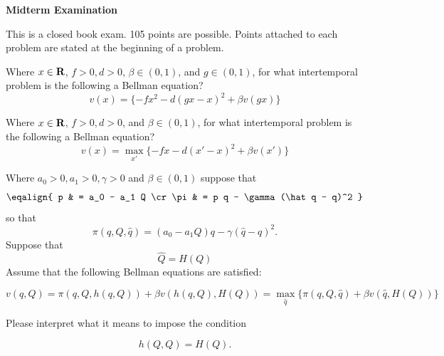 
\paper

\overfullrule=0pt
\def\frac#1#2{#1\over #2}
%
\def\bmatrix#1{\left[ \matrix{#1} \right]}
\def\be{{\beta}}
\def\toone{{t+1}}

\overfullrule=0pt

%

\centerline{\bf Midterm Examination}


\medskip

  This is a closed book  exam.  105 points are possible. Points attached to each problem are stated
at the beginning of a problem.


\medskip
{} Where $x \in {\bf R}$, $f >0, d >0 $,   $\beta \in (0,1)$, and $g \in  (0,1) $, for what intertemporal problem is the following  a Bellman equation?
$$ v(x) =  \{- f x^2 - d(g x  - x)^2 + \beta v(gx) \} $$


\medskip
{}   Where $x \in {\bf R}$, $f >0, d >0 $, and   $\beta \in (0,1)$, for what intertemporal problem is the following  a Bellman equation?
$$ v(x) = \max_{x'} \{ - f x - d(x' - x)^2 + \beta v(x') \} $$



\medskip

 Where $a_0 >0, a_1> 0, \gamma > 0$ and $\beta \in (0,1)$ suppose that
$$\eqalign{ p & = a_0 - a_1 Q \cr
           \pi &  = p q - \gamma(\hat q - q)^2 } $$
so that
$$ \pi(q, Q, \hat q) = (a_0 - a_1 Q) q- \gamma (\hat q - q)^2 .$$
Suppose that
$$ \hat Q  = H(Q)  $$
Assume that the following Bellman equations are satisfied: %

$$ v(q, Q) = \pi(q,Q, h(q,Q)) + \beta v\left(h(q,Q), H(Q)\right) = \max_{\hat q} \{\pi(q, Q, \hat q) + \beta v(\hat q, H(Q) )   \} $$

\noindent Please interpret what it means to impose the condition

$$ h(Q, Q) = H(Q) .$$

\medskip

